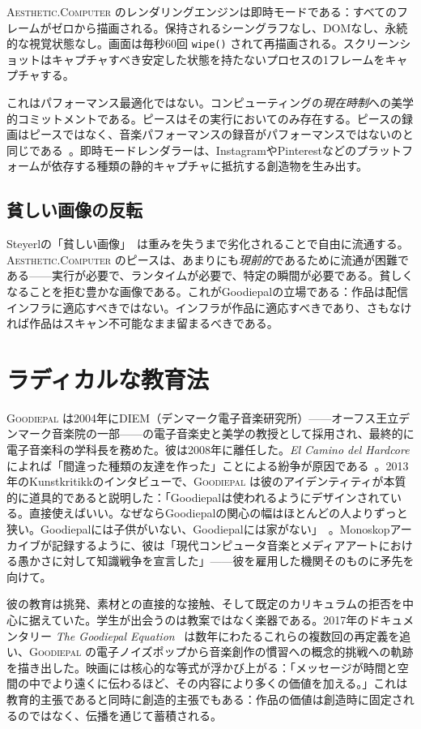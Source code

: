 \documentclass[10pt,letterpaper,twocolumn]{article}
\newcommand{\ac}{\textsc{Aesthetic.Computer}}
\newcommand{\gp}{\textsc{Goodiepal}}
\begin{document}
\ac{} のレンダリングエンジンは即時モードである：すべてのフレームがゼロから描画される。保持されるシーングラフなし、DOMなし、永続的な視覚状態なし。画面は毎秒60回 \texttt{wipe()} されて再描画される。スクリーンショットはキャプチャすべき安定した状態を持たないプロセスの1フレームをキャプチャする。

これはパフォーマンス最適化ではない。コンピューティングの\emph{現在時制}への美学的コミットメントである。ピースはその実行においてのみ存在する。ピースの録画はピースではなく、音楽パフォーマンスの録音がパフォーマンスではないのと同じである~\citep{magnusson2010designing}。即時モードレンダラーは、InstagramやPinterestなどのプラットフォームが依存する種類の静的キャプチャに抵抗する創造物を生み出す。

\subsection{貧しい画像の反転}

Steyerlの「貧しい画像」~\citep{steyerl2009defense}は重みを失うまで劣化されることで自由に流通する。\ac{} のピースは、あまりにも\emph{現前的}であるために流通が困難である——実行が必要で、ランタイムが必要で、特定の瞬間が必要である。貧しくなることを拒む豊かな画像である。これがGoodiepalの立場である：作品は配信インフラに適応すべきではない。インフラが作品に適応すべきであり、さもなければ作品はスキャン不可能なまま留まるべきである。

\section{ラディカルな教育法}

\gp{} は2004年にDIEM（デンマーク電子音楽研究所）——オーフス王立デンマーク音楽院の一部——の電子音楽史と美学の教授として採用され、最終的に電子音楽科の学科長を務めた。彼は2008年に離任した。\emph{El Camino del Hardcore} によれば「間違った種類の友達を作った」ことによる紛争が原因である~\citep{goodiepal2012elcamino}。2013年のKunstkritikkのインタビューで、\gp{} は彼のアイデンティティが本質的に道具的であると説明した：「Goodiepalは使われるようにデザインされている。直接使えばいい。なぜならGoodiepalの関心の幅はほとんどの人よりずっと狭い。Goodiepalには子供がいない、Goodiepalには家がない」~\citep{kunstkritikk2013goodiepal}。Monoskopアーカイブが記録するように、彼は「現代コンピュータ音楽とメディアアートにおける愚かさに対して知識戦争を宣言した」——彼を雇用した機関そのものに矛先を向けて。

彼の教育は挑発、素材との直接的な接触、そして既定のカリキュラムの拒否を中心に据えていた。学生が出会うのは教案ではなく楽器である。2017年のドキュメンタリー \emph{The Goodiepal Equation}~\citep{sanpakkila2017equation} は数年にわたるこれらの複数回の再定義を追い、\gp{} の電子ノイズポップから音楽創作の慣習への概念的挑戦への軌跡を描き出した。映画には核心的な等式が浮かび上がる：「メッセージが時間と空間の中でより遠くに伝わるほど、その内容により多くの価値を加える。」これは教育的主張であると同時に創造的主張でもある：作品の価値は創造時に固定されるのではなく、伝播を通じて蓄積される。
\end{document}
